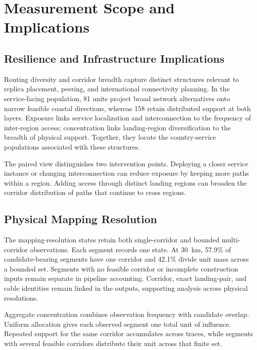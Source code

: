 \section{Measurement Scope and Implications}
\label{sec:scope}

\subsection{Resilience and Infrastructure Implications}
\label{subsec:resilience-implications}

Routing diversity and corridor breadth capture distinct structures relevant
to replica placement, peering, and international connectivity planning. In the
service-facing population, 81 units project broad network alternatives onto
narrow feasible coastal directions, whereas 158 retain distributed support
at both layers. Exposure links service localization and interconnection to
the frequency of inter-region access; concentration links landing-region
diversification to the breadth of physical support. Together, they locate
the country-service populations associated with these structures.

The paired view distinguishes two intervention points. Deploying a closer
service instance or changing interconnection can reduce exposure by keeping
more paths within a region. Adding access through distinct landing regions
can broaden the corridor distribution of paths that continue to cross regions.

\subsection{Physical Mapping Resolution}
\label{subsec:mapping-resolution-scope}

The mapping-resolution states retain both single-corridor and bounded
multi-corridor observations. Each segment records one state. At 30~km,
57.9\% of candidate-bearing segments have one corridor and 42.1\% divide
unit mass across a bounded set. Segments with no feasible corridor or
incomplete construction inputs remain separate in pipeline accounting.
Corridor, exact landing-pair, and cable identities remain linked in the
outputs, supporting analysis across physical resolutions.

Aggregate concentration combines observation frequency with candidate
overlap. Uniform allocation gives each observed segment one total unit of
influence. Repeated support for the same corridor accumulates across traces,
while segments with several feasible corridors distribute their unit across
that finite set.

